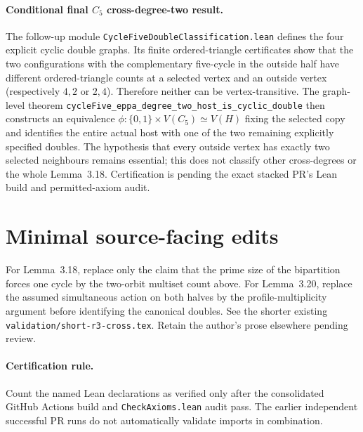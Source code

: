 \documentclass[11pt,a4paper]{article}
\begin{document}
\paragraph{Conditional final \(C_5\) cross-degree-two result.}
The follow-up module \texttt{CycleFiveDoubleClassification.lean}
defines the four explicit cyclic double graphs. Its finite
ordered-triangle certificates show that the two configurations
with the complementary five-cycle in the outside half have
different ordered-triangle counts at a selected vertex and
an outside vertex (respectively \(4,2\) or \(2,4\)).
Therefore neither can be vertex-transitive.
The graph-level theorem
\texttt{cycleFive\_eppa\_degree\_two\_host\_is\_cyclic\_double}
then constructs an equivalence
\(\phi:\{0,1\}\times V(C_5)\simeq V(H)\) fixing the selected
copy and identifies the entire actual host with one of the
two remaining explicitly specified doubles.
The hypothesis that every outside vertex has exactly two
selected neighbours remains essential; this does not
classify other cross-degrees or the whole Lemma~3.18.
Certification is pending the exact stacked PR's
Lean build and permitted-axiom audit.

\section*{Minimal source-facing edits}
For Lemma~3.18, replace only the claim that
the prime size of the bipartition forces one
cycle by the two-orbit multiset count above.
For Lemma~3.20, replace the assumed
simultaneous action on both halves by the
profile-multiplicity argument before identifying
the canonical doubles. See the shorter existing
\texttt{validation/short-r3-cross.tex}.
Retain the author's prose elsewhere pending review.

\paragraph{Certification rule.}
Count the named Lean declarations as verified only
after the consolidated GitHub Actions build and
\texttt{CheckAxioms.lean} audit pass. The earlier
independent successful PR runs do not automatically
validate imports in combination.
\end{document}
